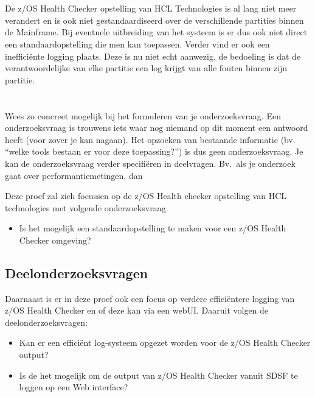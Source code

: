 \section{}
\label{sec:probleemstelling}

De z/OS Health Checker opstelling van HCL Technologies is al lang niet meer verandert en is ook niet gestandaardiseerd over de verschillende partities binnen de Mainframe. Bij eventuele uitbreiding van het systeem is er dus ook niet direct een standaardopstelling die men kan toepassen. Verder vind er ook een inefficiënte logging plaats. Deze is nu niet echt aanwezig, de bedoeling is dat de verantwoordelijke van elke partitie een log krijgt van alle fouten binnen zijn partitie.

\section{}
\label{sec:Hoofdonderzoeksvraag}

Wees zo concreet mogelijk bij het formuleren van je onderzoeksvraag. Een onderzoeksvraag is trouwens iets waar nog niemand op dit moment een antwoord heeft (voor zover je kan nagaan). Het opzoeken van bestaande informatie (bv. ``welke tools bestaan er voor deze toepassing?'') is dus geen onderzoeksvraag. Je kan de onderzoeksvraag verder specifiëren in deelvragen. Bv.~als je onderzoek gaat over performantiemetingen, dan 

Deze proef zal zich focussen op de z/OS Health checker opstelling van HCL technologies met volgende onderzoeksvraag.

\begin{itemize}
	\item Is het mogelijk een standaardopstelling te maken voor een z/OS Health Checker omgeving?
\end{itemize}

\subsection{Deelonderzoeksvragen}
\label{subsec:Deelonderzoeksvragen}

Daarnaast is er in deze proef ook een focus op verdere efficiëntere logging van z/OS Health Checker en of deze kan via een webUI. Daaruit volgen de deelonderzoeksvragen:

\begin{itemize}
	\item Kan er een efficiënt log-systeem opgezet worden voor de z/OS Health Checker output?
	\item Is de het mogelijk om de output van z/OS Health Checker vanuit SDSF te loggen op een Web interface?
\end{itemize}


